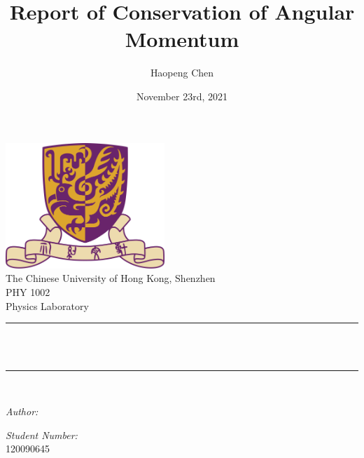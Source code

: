 \title{Report of Conservation of Angular Momentum} %
\author{Haopeng Chen}%
\date{November 23rd, 2021}%



\rmfamily


\begin{titlepage}
  \centering
  \vspace*{0.5 cm}
  \includegraphics[scale = 0.75,width=6cm]{CUHK}\\[1.0 cm]   %
  \textnormal{\large The Chinese University of Hong Kong, Shenzhen}\\[2.0 cm]
  \textnormal{\Large PHY 1002}\\[0.5 cm]
  \textnormal{\large Physics Laboratory}\\[0.5 cm]               %
  \rule{\linewidth}{0.2 mm} \\[0.4 cm]
  { \huge \bfseries \thetitle}\\
  \rule{\linewidth}{0.2 mm} \\[1.5 cm]

  \begin{minipage}{0.4\textwidth}
    \begin{flushleft} \large
      \emph{Author:}\\
      \theauthor
    \end{flushleft}
  \end{minipage}
  \begin{minipage}{0.4\textwidth}
    \begin{flushright} \large
      \emph{Student Number:} \\
      120090645  %
    \end{flushright}
  \end{minipage}\\[2 cm]
  {\large \thedate}\\[2 cm]

  \vfill

\end{titlepage}

